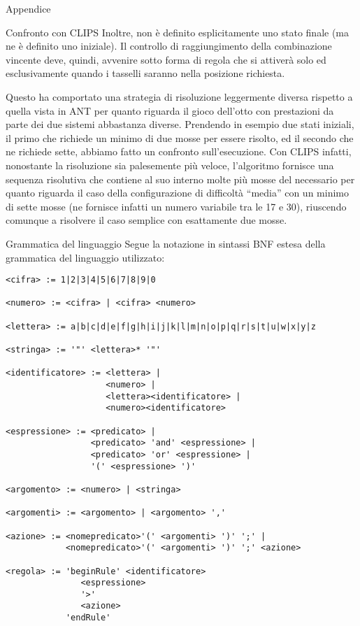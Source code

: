 \begin{chapter}{Appendice}
\begin{section}{Confronto con CLIPS}
Inoltre, non \`e definito esplicitamente uno stato finale (ma ne \`e definito
uno iniziale). Il controllo di raggiungimento della combinazione vincente deve,
quindi, avvenire sotto forma di regola che si attiver\`a solo ed esclusivamente
quando i tasselli saranno nella posizione richiesta.

Questo ha comportato una strategia di risoluzione leggermente diversa rispetto a
quella vista in ANT per quanto riguarda il gioco dell'otto con prestazioni
da parte dei due sistemi abbastanza diverse.
Prendendo in esempio due stati iniziali, il primo che richiede un minimo di due
mosse per essere risolto, ed il secondo che ne richiede sette, abbiamo fatto un
confronto sull'esecuzione. Con CLIPS infatti, nonostante la risoluzione sia
palesemente pi\`u veloce, l'algoritmo fornisce una sequenza risolutiva che contiene
al suo interno molte pi\`u mosse del necessario per quanto riguarda il caso della
configurazione di difficolt\`a ``media'' con un minimo di sette mosse (ne fornisce
infatti un numero variabile tra le 17 e 30), riuscendo comunque a risolvere il caso
semplice con esattamente due mosse.
\end{section}

\begin{section}{Grammatica del linguaggio}
\label{sec:grammar}
Segue la notazione in sintassi BNF estesa della grammatica del
linguaggio utilizzato:

\begin{verbatim}
<cifra> := 1|2|3|4|5|6|7|8|9|0

<numero> := <cifra> | <cifra> <numero>

<lettera> := a|b|c|d|e|f|g|h|i|j|k|l|m|n|o|p|q|r|s|t|u|w|x|y|z

<stringa> := '"' <lettera>* '"'

<identificatore> := <lettera> |
                    <numero> |
                    <lettera><identificatore> |
                    <numero><identificatore>

<espressione> := <predicato> |
                 <predicato> 'and' <espressione> |
                 <predicato> 'or' <espressione> |
                 '(' <espressione> ')'

<argomento> := <numero> | <stringa>

<argomenti> := <argomento> | <argomento> ','

<azione> := <nomepredicato>'(' <argomenti> ')' ';' |
            <nomepredicato>'(' <argomenti> ')' ';' <azione>

<regola> := 'beginRule' <identificatore>
               <espressione>
               '>'
               <azione>
            'endRule'


\end{verbatim}
\end{section}
\end{chapter}
